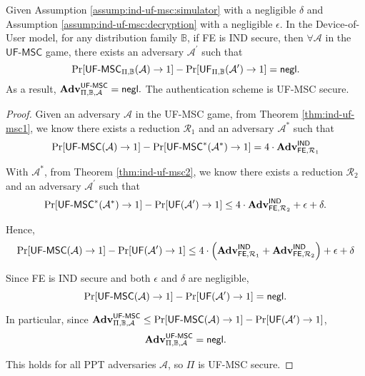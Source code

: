 \begin{corollary}
Given Assumption \ref{assump:ind-uf-msc:simulator} with a negligible $\delta$ and Assumption \ref{assump:ind-uf-msc:decryption} with a negligible $\epsilon$.
In the Device-of-User model, for any distribution family $\mathbb{B}$, if \textsf{FE} is IND secure, then $\forall \mathcal{A}$ in the $\textsf{UF-MSC}$ game, there exists an adversary $\mathcal{A}^\prime$ such that
\[
	\Pr[\textsf{UF-MSC}_{\Pi, \mathbb{B}}(\mathcal{A}) \to 1] - \Pr[\textsf{UF}_{\Pi, \mathbb{B}}(\mathcal{A}^\prime) \to 1] = \mathsf{negl}.
\]
As a result, $\mathbf{Adv}_{\Pi, \mathbb{B}, \mathcal{A}}^{\textsf{UF-MSC}} = \mathsf{negl}.$ The authentication scheme is UF-MSC secure.	

\end{corollary}

\begin{proof}

Given an adversary $\mathcal{A}$ in the \textsf{UF-MSC} game, from Theorem \ref{thm:ind-uf-msc1}, we know there exists a reduction $\mathcal{R}_1$ and an adversary $\mathcal{A}^*$ such that
\[
	\Pr[\textsf{UF-MSC}(\mathcal{A}) \to 1] - \Pr[ \textsf{UF-MSC}^*(\mathcal{A}^*) \to 1 ] = 4 \cdot \mathbf{Adv}_{\textsf{FE}, \mathcal{R}_1}^\textsf{IND}
\]

With $\mathcal{A}^*$, from Theorem \ref{thm:ind-uf-msc2}, we know there exists a reduction $\mathcal{R}_2$ and an adversary $\mathcal{A}^\prime$ such that 
\[
	\Pr[\textsf{UF-MSC}^*(\mathcal{A}^*) \to 1] - \Pr[\textsf{UF}(\mathcal{A}^\prime) \to 1] \leq 4 \cdot \mathbf{Adv}_{\textsf{FE}, \mathcal{R}_2}^\textsf{IND} + \epsilon + \delta.
\]

Hence,
\[
	\Pr[\textsf{UF-MSC}(\mathcal{A}) \to 1] - \Pr[\textsf{UF}(\mathcal{A}^\prime) \to 1] \leq 4 \cdot \left( \mathbf{Adv}_{\textsf{FE}, \mathcal{R}_1}^\textsf{IND} + \mathbf{Adv}_{\textsf{FE}, \mathcal{R}_2}^\textsf{IND} \right) + \epsilon + \delta
\]

Since \textsf{FE} is \textsf{IND} secure and both $\epsilon$ and $\delta$ are negligible,
\[
	\Pr[\textsf{UF-MSC}(\mathcal{A}) \to 1] - \Pr[\textsf{UF}(\mathcal{A}^\prime) \to 1] = \mathsf{negl}.
\]

In particular, since $\mathbf{Adv}_{\Pi, \mathbb{B}, \mathcal{A}}^{\textsf{UF-MSC}} \leq \Pr[\textsf{UF-MSC}(\mathcal{A}) \to 1] - \Pr[\textsf{UF}(\mathcal{A}^\prime) \to 1]$,
\[
	\mathbf{Adv}_{\Pi, \mathbb{B}, \mathcal{A}}^{\textsf{UF-MSC}} = \mathsf{negl}.
\]

This holds for all PPT adversaries $\mathcal{A}$, so $\Pi$ is UF-MSC secure.

\end{proof}



% 

\nocite{*}
\printbibliography



